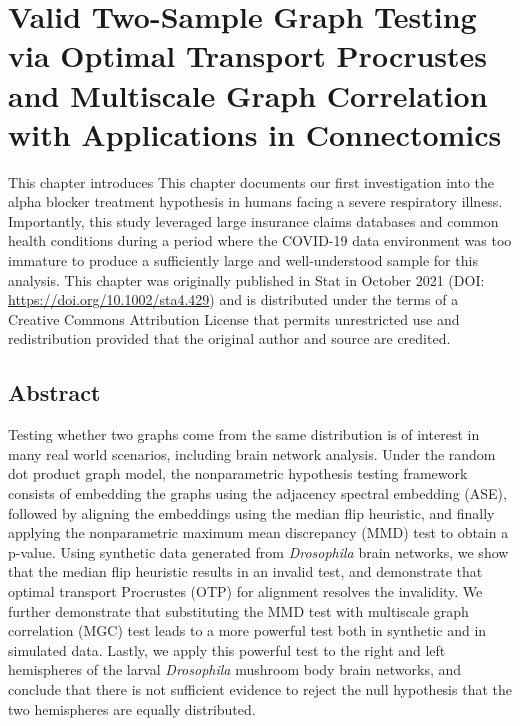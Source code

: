 \chapter[Two-Sample Graph Testing]{Valid Two-Sample Graph Testing via Optimal Transport Procrustes and Multiscale Graph Correlation with Applications in Connectomics} \label{chap:nonpar}

This chapter introduces
This chapter documents our first investigation into the alpha blocker treatment hypothesis in humans facing a severe respiratory illness. Importantly, this study leveraged large insurance claims databases and common health conditions during a period where the COVID-19 data environment was too immature to produce a sufficiently large and well-understood sample for this analysis. This chapter was originally published in Stat in October 2021 (DOI:  \url{https://doi.org/10.1002/sta4.429}) and is distributed under the terms of a Creative Commons Attribution License that permits unrestricted use and redistribution provided that the original author and source are credited.

\begin{singlespace}         %
     
\end{singlespace} 

\pagebreak
\section*{Abstract}
Testing whether two graphs come from the same distribution is of interest in many real world scenarios, including brain network analysis.
Under the random dot product graph model, the nonparametric hypothesis testing framework consists of embedding the graphs using the adjacency spectral embedding (ASE), followed by  aligning the embeddings using the median flip heuristic, and finally applying the nonparametric maximum mean discrepancy (MMD) test to obtain a p-value.
Using synthetic data generated from \textit{Drosophila} brain networks, we show that the median flip heuristic results in an invalid test, and demonstrate that optimal transport Procrustes (OTP) for alignment resolves the invalidity.
We further demonstrate that substituting the MMD test with multiscale graph correlation (MGC) test leads to a more powerful test both in synthetic and in simulated data.
Lastly, we apply this powerful test to the right and left hemispheres of the larval \textit{Drosophila} mushroom body brain networks, and conclude that there is not sufficient evidence to reject the null hypothesis that the two hemispheres are equally distributed.

